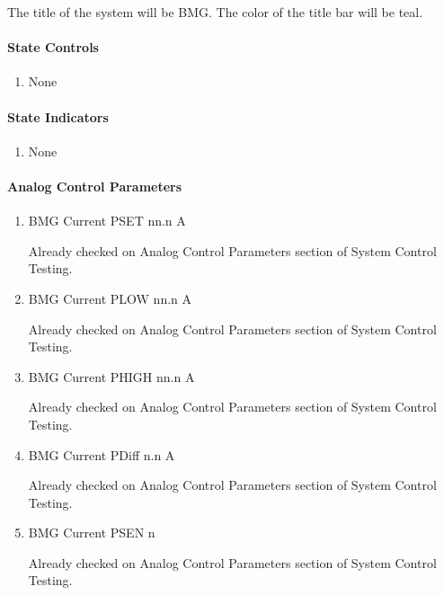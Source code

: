 \documentclass[11pt]{book}		%
\begin{document}
The title of the system will be BMG.  The color of the title bar will be teal.

\paragraph{State Controls}

\begin{enumerate}
\item None
\end{enumerate}

\paragraph{State Indicators}

\begin{enumerate}
 \item None
\end{enumerate}

\paragraph{Analog Control Parameters}

\begin{enumerate}
 \item BMG Current PSET   nn.n A

\color{red}
Already checked on Analog Control Parameters section of System Control Testing.
\color{black}

 \item BMG Current PLOW   nn.n A

\color{red}
Already checked on Analog Control Parameters section of System Control Testing.
\color{black}

 \item BMG Current PHIGH  nn.n A

\color{red}
Already checked on Analog Control Parameters section of System Control Testing.
\color{black}

 \item BMG Current PDiff n.n A

\color{red}
Already checked on Analog Control Parameters section of System Control Testing.
\color{black}

 \item BMG Current PSEN  n

\color{red}
Already checked on Analog Control Parameters section of System Control Testing.
\color{black}

\end{enumerate}
\end{document}
